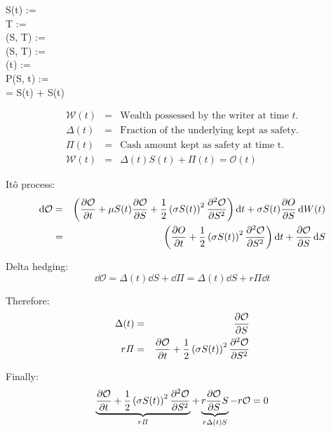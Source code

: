 \renewcommand{\O}{\mathcal{O}}
\newcommand{\W}{\mathcal{W}}
\newcommand{\Piit}{\mathit{\Pi}}

\usepackage{physics}

S(t) :=  \\
T :=  \\
(S, T) :=  \\
(S, T) :=  \\
(t) :=  \\
P(S, t) :=  \\

 = \mu S(t)  + \sigma S(t) 

\begin{eqnarray*}
\W(t)               & = & \text{Wealth possessed by the writer at time $t$.} \\
\Delta(t)           & = & \text{Fraction of the underlying kept as safety.}\\
\mathit{\Pi(t)}     & = & \text{Cash amount kept as safety at time t.}\\
\W (t)              & = & \Delta (t)S(t) + \mathit{\Pi (t)} = \O(t)
\end{eqnarray*}

Itô process:
\begin{eqnarray*}
\dd{\O} & = & \left( \pdv{\O}{t} + \mu S(t) \pdv{\O}{S} + \frac{1}{2} \left( \sigma S(t) \right)^2 \pdv[2]{\O}{S} \right) \dd{t} + \sigma S(t) \pdv{O}{S}\dd{W(t)} \\
& = & \left( \pdv{O}{t} + \frac{1}{2}\left( \sigma S(t) \right)^2 \pdv[2]{\O}{S} \right) \dd{t} + \pdv{\O}{S}\dd{S}
\end{eqnarray*}

Delta hedging:
\begin{equation*}
    \dd{\O} = \Delta (t) \dd{S} + \dd{\Piit} = \Delta(t)\dd{S} + r\Piit \dd{t}
\end{equation*}

Therefore:
\begin{eqnarray*}
    \Delta(t) &=& \pdv{\O}{S} \\
    r\Piit    &=& \pdv{\O}{t} + \frac{1}{2} \left( \sigma S(t) \right)^2 \pdv[2]{\O}{S}
\end{eqnarray*}

Finally:
\begin{equation*}
    \underbrace{\pdv{\O}{t} + \frac{1}{2} \left( \sigma S(t) \right)^2 \pdv[2]{\O}{S}}_{r \Piit} + \underbrace{r \pdv{\O}{S} S}_{r \Delta(t) S} - r \O = 0
\end{equation*}

